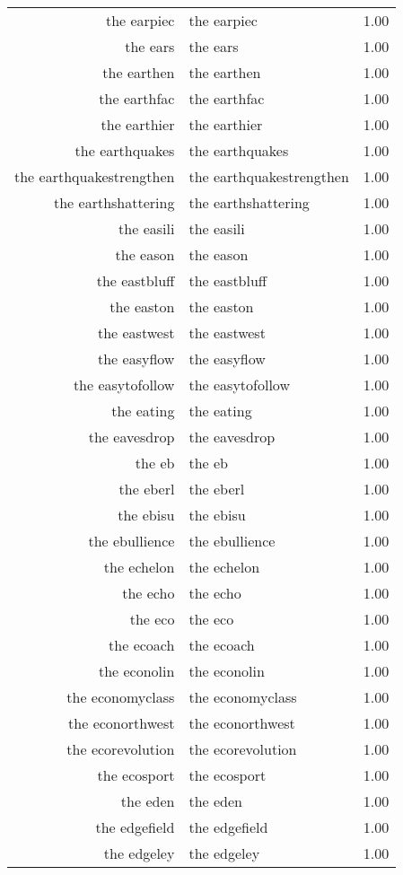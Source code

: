 \begin{table}[ht]
\begin{tabular}{rlr}
  the earpiec & the earpiec & 1.00 \\ 
  the ears & the ears & 1.00 \\ 
  the earthen & the earthen & 1.00 \\ 
  the earthfac & the earthfac & 1.00 \\ 
  the earthier & the earthier & 1.00 \\ 
  the earthquakes & the earthquakes & 1.00 \\ 
  the earthquakestrengthen & the earthquakestrengthen & 1.00 \\ 
  the earthshattering & the earthshattering & 1.00 \\ 
  the easili & the easili & 1.00 \\ 
  the eason & the eason & 1.00 \\ 
  the eastbluff & the eastbluff & 1.00 \\ 
  the easton & the easton & 1.00 \\ 
  the eastwest & the eastwest & 1.00 \\ 
  the easyflow & the easyflow & 1.00 \\ 
  the easytofollow & the easytofollow & 1.00 \\ 
  the eating & the eating & 1.00 \\ 
  the eavesdrop & the eavesdrop & 1.00 \\ 
  the eb & the eb & 1.00 \\ 
  the eberl & the eberl & 1.00 \\ 
  the ebisu & the ebisu & 1.00 \\ 
  the ebullience & the ebullience & 1.00 \\ 
  the echelon & the echelon & 1.00 \\ 
  the echo & the echo & 1.00 \\ 
  the eco & the eco & 1.00 \\ 
  the ecoach & the ecoach & 1.00 \\ 
  the econolin & the econolin & 1.00 \\ 
  the economyclass & the economyclass & 1.00 \\ 
  the econorthwest & the econorthwest & 1.00 \\ 
  the ecorevolution & the ecorevolution & 1.00 \\ 
  the ecosport & the ecosport & 1.00 \\ 
  the eden & the eden & 1.00 \\ 
  the edgefield & the edgefield & 1.00 \\ 
  the edgeley & the edgeley & 1.00 \\ 

\end{tabular}
\end{table}
